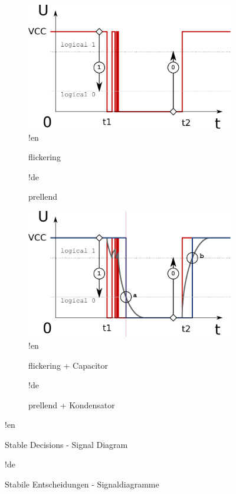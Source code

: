\begin{figure}
  \begin{subfigure}[htbp]{0.485\textwidth}
    \centering
    \includegraphics[width=\textwidth]{LED/S005_stable-decisions_ideal_signal+flicker.pdf}
!en     \caption{flickering}
!de     \caption{prellend}
    \label{S005SignalDiagam-Flicker}
  \end{subfigure}
  \quad
  \begin{subfigure}[htbp]{0.485\textwidth}
    \centering
    \includegraphics[width=\textwidth]{LED/S005_stable-decisions_ideal_signal+flicker+C.pdf}
!en     \caption{flickering + Capacitor}
!de     \caption{prellend + Kondensator}
    \label{S005SignalDiagam-Flicker+C}
  \end{subfigure}
!en   \caption{Stable Decisions - Signal Diagram}
!de   \caption{Stabile Entscheidungen - Signaldiagramme}
  \label{S005SignalDiagam}
\end{figure}




